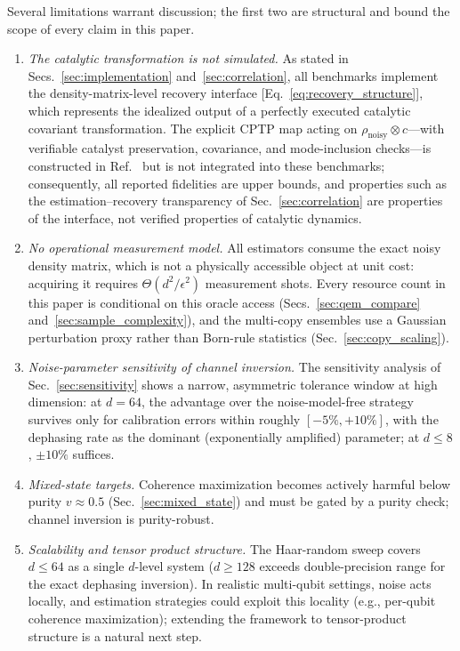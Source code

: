 \documentclass[a4paper,onecolumn]{quantumarticle}
\newcommand{\rhon}{\rho_\mathrm{noisy}}
\begin{document}
Several limitations warrant discussion; the first two are structural and bound the scope of every claim in this paper.
\begin{enumerate}
\item \emph{The catalytic transformation is not simulated.}
As stated in Secs.~\ref{sec:implementation} and~\ref{sec:correlation}, all benchmarks implement the density-matrix-level recovery interface [Eq.~\eqref{eq:recovery_structure}], which represents the idealized output of a perfectly executed catalytic covariant transformation.
The explicit CPTP map acting on $\rhon \otimes c$---with verifiable catalyst preservation, covariance, and mode-inclusion checks---is constructed in Ref.~\cite{Wakaura2026unified} but is not integrated into these benchmarks; consequently, all reported fidelities are upper bounds, and properties such as the estimation--recovery transparency of Sec.~\ref{sec:correlation} are properties of the interface, not verified properties of catalytic dynamics.
\item \emph{No operational measurement model.}
All estimators consume the exact noisy density matrix, which is not a physically accessible object at unit cost: acquiring it requires $\Theta(d^2/\epsilon^2)$ measurement shots.
Every resource count in this paper is conditional on this oracle access (Secs.~\ref{sec:qem_compare} and~\ref{sec:sample_complexity}), and the multi-copy ensembles use a Gaussian perturbation proxy rather than Born-rule statistics (Sec.~\ref{sec:copy_scaling}).
\item \emph{Noise-parameter sensitivity of channel inversion.}
The sensitivity analysis of Sec.~\ref{sec:sensitivity} shows a narrow, asymmetric tolerance window at high dimension: at $d = 64$, the advantage over the noise-model-free strategy survives only for calibration errors within roughly $[-5\%, +10\%]$, with the dephasing rate as the dominant (exponentially amplified) parameter; at $d \leq 8$, $\pm 10\%$ suffices.
\item \emph{Mixed-state targets.}
Coherence maximization becomes actively harmful below purity $v \approx 0.5$ (Sec.~\ref{sec:mixed_state}) and must be gated by a purity check; channel inversion is purity-robust.
\item \emph{Scalability and tensor product structure.}
The Haar-random sweep covers $d \leq 64$ as a single $d$-level system ($d \geq 128$ exceeds double-precision range for the exact dephasing inversion).
In realistic multi-qubit settings, noise acts locally, and estimation strategies could exploit this locality (e.g., per-qubit coherence maximization); extending the framework to tensor-product structure is a natural next step.

\end{enumerate}
\end{document}
